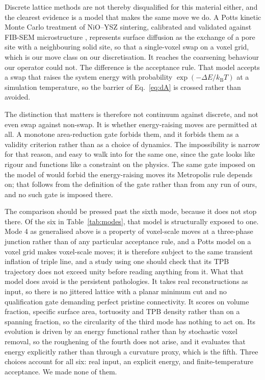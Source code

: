 \documentclass[5p,times,twocolumn]{elsarticle}
\begin{document}
Discrete lattice methods are not thereby disqualified for this material
either, and the clearest evidence is a model that makes the same move we do. A
Potts kinetic Monte Carlo treatment of NiO--YSZ sintering, calibrated and
validated against FIB-SEM microstructure \cite{zhou2023}, represents surface
diffusion as the exchange of a pore site with a neighbouring solid site, so
that a
single-voxel swap on a voxel grid, which is our move class on our
discretisation. It reaches the coarsening behaviour our operator could not.
The difference is the acceptance rule. That model accepts a swap that raises
the system energy with probability $\exp(-\Delta E / k_{\mathrm{B}}T)$ at a
simulation temperature, so the barrier of Eq.~\eqref{eq:dA} is crossed rather
than avoided.

The distinction that matters is therefore not continuum against discrete, and
not even swap against non-swap. It is whether energy-raising moves are
permitted at all. A monotone area-reduction gate forbids them, and it forbids
them as a validity criterion rather than as a choice of dynamics. The impossibility is narrow for that reason, and easy to walk into for the
same one, since the
gate looks like rigour and functions like a constraint on the physics. The
same gate imposed on the model of \cite{zhou2023} would forbid the
energy-raising moves its Metropolis rule depends on; that follows from the
definition of the gate rather than from any run of ours, and no such gate is
imposed there.

The comparison should be pressed past the sixth mode, because it does not stop
there. Of the six in Table~\ref{tab:modes}, that model is structurally exposed
to one. Mode 4 as generalised above is a property of voxel-scale moves at a
three-phase junction rather than of any particular acceptance rule, and a Potts
model on a voxel grid makes voxel-scale moves; it is therefore subject to the
same transient inflation of triple line, and a study using one should check
that its TPB trajectory does not exceed unity before reading anything from it.
What that model does avoid is the persistent pathologies. It
takes real reconstructions as input, so there is no jittered lattice with a
planar minimum cut and no qualification gate demanding perfect pristine
connectivity. It scores on volume fraction, specific surface area, tortuosity
and TPB density rather than on a spanning fraction, so the circularity of the
third mode has nothing to act on. Its evolution is driven by an energy
functional rather than by stochastic voxel removal, so the roughening of the
fourth does not arise, and it evaluates that energy explicitly rather than
through a curvature proxy, which is the fifth. Three choices account for all
six: real input, an explicit energy, and finite-temperature acceptance. We
made none of them.
\end{document}
